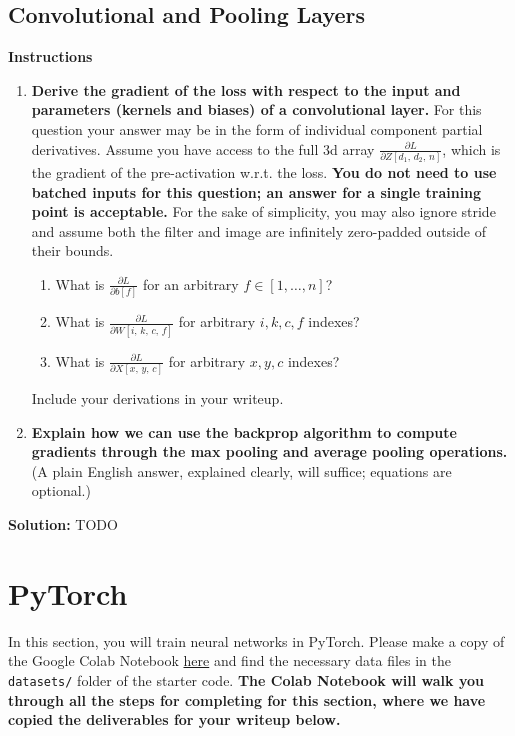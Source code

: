 \documentclass{article}
\newcommand{\Question}[1]{\Large \section{ #1 } \normalsize}
\newenvironment{solution}{\color{blue} \smallskip \textbf{Solution:}}{}
\begin{document}
\subsection{Convolutional and Pooling Layers}
\textbf{Instructions}
\begin{enumerate}
    \item 
    \textbf{Derive the gradient of the loss with respect to the input and parameters (kernels and biases) of a convolutional layer.} 
    For this question your answer may be in the form of individual component partial derivatives. 
    Assume you have access to the full 3d array $\frac{\partial L}{\partial Z[d_1,\, d_2,\, n]}$, which is the gradient of the pre-activation w.r.t. the loss. 
    \textbf{You do not need to use batched inputs for this question; an answer for a single training point is acceptable.} 
    For the sake of simplicity, you may also ignore stride and assume both the filter and image are infinitely zero-padded outside of their bounds.
    \begin{enumerate}
        \item 
        What is $\frac{\partial L}{\partial b[f]}$ for an arbitrary $f \in [1, \dots, n]$?
        \item 
        What is $\frac{\partial L}{\partial W[i,\, k,\, c,\, f]}$ for arbitrary $i, k, c, f$ indexes? 
        \item 
        What is $\frac{\partial L}{\partial X[x,\, y,\, c]}$ for arbitrary $x, y, c$ indexes? 
    \end{enumerate}
    Include your derivations in your writeup.
    
    \item 
    \textbf{Explain how we can use the backprop algorithm to compute gradients through the max pooling and average pooling operations.} 
    (A plain English answer, explained clearly, will suffice; equations are optional.) 
\end{enumerate}

\begin{solution}
    TODO
\end{solution}

\newpage
\Question{PyTorch}
In this section, you will train neural networks in PyTorch. 
Please make a copy of the Google Colab Notebook \href{https://colab.research.google.com/drive/1CYrntMond0Q8hw2UWS_N2sBwwDW2xhbn?usp=sharing}{here} and find the necessary data files in the \texttt{datasets/} folder of the starter code. 
\textbf{The Colab Notebook will walk you through all the steps for completing for this section, where we have copied the deliverables for your writeup below.}
\end{document}
